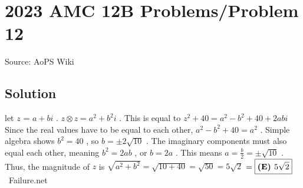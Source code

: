 \documentclass[12pt]{article}
\begin{document}
\section*{{2023 AMC 12B Problems/Problem 12}}
Source: AoPS Wiki

\subsection*{Solution}
let $z$ = $a+bi$ . $z \otimes z = a^{2}+b^{2}i$ . This is equal to $z^{2} + 40 = a^{2}-b^{2}+40+2abi$ Since the real values have to be equal to each other, $a^{2}-b^{2}+40 = a^{2}$ .
Simple algebra shows $b^{2} = 40$ , so $b = \pm 2\sqrt{10}$ . The imaginary components must also equal each other, meaning $b^{2} = 2ab$ , or $b = 2a$ . This means $a = \frac{b}{2} = \pm \sqrt{10}$ . Thus, the magnitude of $z$ is $\sqrt{a^{2}+b^{2}} = \sqrt{10+40} = \sqrt{50} = 5\sqrt{2}$ $=\text{\boxed{\textbf{(E) }5\sqrt{2}}}$ ~Failure.net
\end{document}
